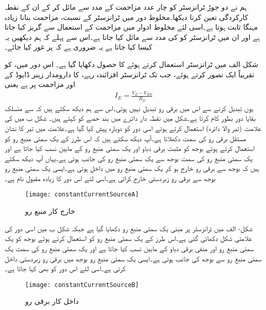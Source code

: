 ہم نے دو جوڑ ٹرانزسٹر کو چار عدد مزاحمت کے مدد سے مائل کر کے ان کے نقطہ کارکردگی تعین کرنا دیکھا۔مخلوط دور میں ٹرانزسٹر کے نسبت، مزاحمت بنانا زیادہ مہنگا ثابت ہوتا ہے۔اسی لئے مخلوط ادوار میں مزاحمت کے استعمال سے گریز کیا جاتا ہے اور ان میں ٹرانزسٹر کو   کی مدد سے مائل کیا جاتا ہے۔اس سے پہلے کہ ہم دیکھیں یہ کیسا کیا جاتا ہے یہ ضروری ہے کہ  پر غور کیا جائے۔

شکل   الف میں   ٹرانزسٹر استعمال کرتے ہوئے  کا حصول دکھایا گیا ہے۔ اس دور میں،  کو تقریباً ایک   تصور کرتے ہوئے، جب تک ٹرانزسٹر افزائندہ  رہے،   کا دارومدار زینر ڈایوڈ کے  اور مزاحمت  پر ہے یعنی
\begin{align*}
I_E=\frac{V_Z-V_{BE}}{R_E}
\end{align*}
یوں   تبدیل کرنے سے اس میں برقی رو تبدیل نہیں ہوتی۔اس سے ہم دیکھ سکتے ہیں کہ    سے منسلک بقایا دور بطور  کام کرتا ہے۔شکل میں نقطہ دار دائرے میں بند حصے کو  کہتے ہیں۔
شکل  ب میں  کی علامت (تیر والا دائرہ) استعمال کرتے ہوئے اسی دور کو دوبارہ پیش کیا گیا ہے۔علامت میں تیر کا نشان مستقل برقی رو کی سمت دکھلاتا ہے۔آپ دیکھ سکتے ہیں کہ اس طرز کے یک سمتی  منبع رو کو استعمال کرتے ہوئے بوجھ کو مثبت برقی دباو  اور یک سمتی  منبع رو کے مابین نسب کیا جاتا ہے اور یک سمتی  منبع رو  کی سمت بوجھ سے یک سمتی  منبع رو کی جانب ہوتی ہے۔یہاں آپ دیکھ سکتے ہیں کہ بوجھ سے برقی رو خارج ہو کر یک سمتی  منبع رو میں داخل ہوتی ہے۔ایسی یک سمتی  منبع رو بوجھ سے برقی رو زبردستی خارج  کراتی ہے۔اسی لئے اس دور کا زیادہ مقبول نام  ہے۔ 
\begin{figure}
\centering
\texttt{[image: constantCurrentSourceA]}
\caption{خارج کار منبع رو}
\label{شکل_پیداکار_مستقل_برقی_رو}
\end{figure}
شکل- الف میں  ٹرانزسٹر پر مبنی یک سمتی  منبع رو دکھایا گیا ہے جبکہ شکل  ب میں اسی دور کی علامتی شکل دکھائی گئی ہے۔اس طرز کے یک سمتی  منبع رو کو استعمال کرتے ہوئے بوجھ کو یک سمتی  منبع رو اور منفی برقی دباو   کے مابین نسب کیا جاتا ہے اور یک سمتی  منبع رو  کی سمت یک سمتی  منبع رو سے بوجھ کی جانب ہوتی ہے۔ایسی یک سمتی  منبع رو بوجھ میں برقی رو زبردستی داخل  کرتی ہے۔اسی لئے اس دور کو  بھی کہا جاتا ہے۔ 
\begin{figure}
\centering
\texttt{[image: constantCurrentSourceB]}
\caption{داخل کار برقی رو}
\label{شکل_پیداکار_مستقل_برقی_رو_ب}
\end{figure}

